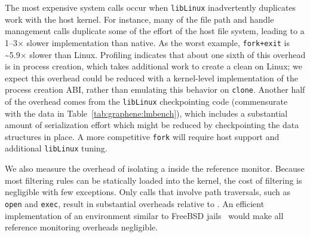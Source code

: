 The most expensive system calls occur when {\tt libLinux} inadvertently duplicates work
with the host kernel.  
For instance, many of the file path and handle management calls duplicate some of the effort of the host file system,
leading to a 1--3$\times$ slower implementation than native.
As the worst example,
{\tt fork+exit} is \~{}5.9$\times$ slower than Linux.
Profiling indicates that about one sixth of this overhead is in process creation, which 
takes additional work to create a clean \picoproc{} on Linux; we expect this overhead could be reduced
with a kernel-level implementation of the process creation ABI, rather than emulating this behavior on {\tt clone}.
Another half of the overhead comes from the
{\tt libLinux} checkpointing code (commensurate with the data in Table~\ref{tab:graphene:lmbench}), which 
includes a substantial amount of serialization effort which might be reduced by checkpointing the data structures in place.
A more competitive {\tt fork} will require host support and additional {\tt libLinux} tuning.

We also measure the overhead of isolating a \sysname{} \picoproc{} inside the reference monitor.
Because most filtering rules can be statically loaded into the kernel,
the cost of filtering is negligible with few exceptions.
Only calls that
involve path traversals, such as {\tt open} and {\tt exec}, result in substantial overheads relative to \sysname{}.
An efficient implementation of an environment similar to FreeBSD  jails~\citep{jails}
would make all reference monitoring overheads negligible.

